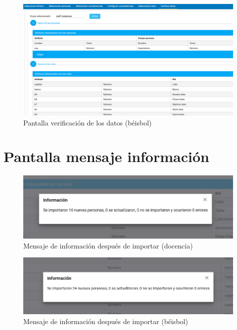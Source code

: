 {\begin{figure}[H]
	\centering
	\includegraphics[width=\textwidth]{figuras/beisbol_verificacion.png}
	\caption{Pantalla verificación de los datos (béisbol)} \label{fig:verificar_datos_beisbol}
\end{figure}



\chapter{Pantalla mensaje información}
\begin{figure}[H]
	\centering
	\includegraphics[width=\textwidth]{figuras/docencia_resultados.png}
	\caption{Mensaje de información después de importar (docencia)} \label{fig:resultados_docencia}
\end{figure}

\begin{figure}[H]
	\centering
	\includegraphics[width=\textwidth]{figuras/beisbol_resultados.png}
	\caption{Mensaje de información después de importar (béisbol)} \label{fig:resultados_beisbol}
\end{figure}



}
